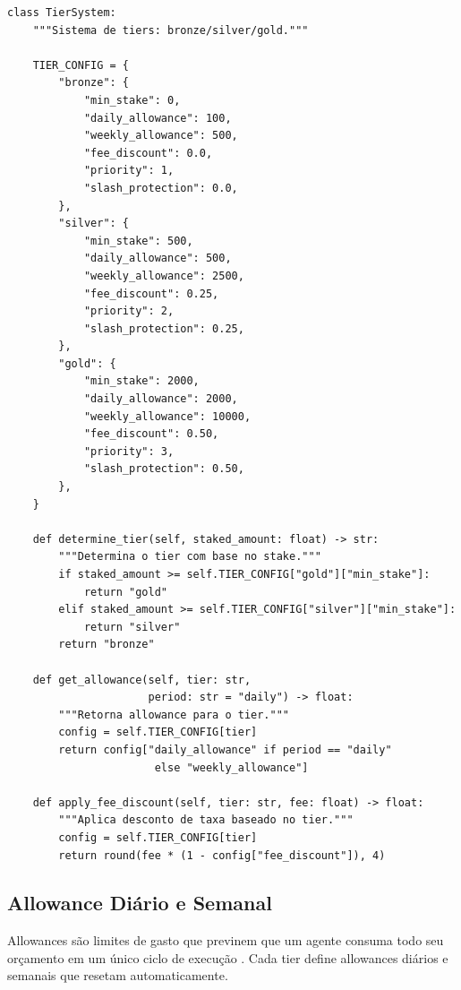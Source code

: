 \begin{lstlisting}[caption={Sistema de tiers da SPEC-023},label={lst:tiers}]
class TierSystem:
    """Sistema de tiers: bronze/silver/gold."""

    TIER_CONFIG = {
        "bronze": {
            "min_stake": 0,
            "daily_allowance": 100,
            "weekly_allowance": 500,
            "fee_discount": 0.0,
            "priority": 1,
            "slash_protection": 0.0,
        },
        "silver": {
            "min_stake": 500,
            "daily_allowance": 500,
            "weekly_allowance": 2500,
            "fee_discount": 0.25,
            "priority": 2,
            "slash_protection": 0.25,
        },
        "gold": {
            "min_stake": 2000,
            "daily_allowance": 2000,
            "weekly_allowance": 10000,
            "fee_discount": 0.50,
            "priority": 3,
            "slash_protection": 0.50,
        },
    }

    def determine_tier(self, staked_amount: float) -> str:
        """Determina o tier com base no stake."""
        if staked_amount >= self.TIER_CONFIG["gold"]["min_stake"]:
            return "gold"
        elif staked_amount >= self.TIER_CONFIG["silver"]["min_stake"]:
            return "silver"
        return "bronze"

    def get_allowance(self, tier: str,
                      period: str = "daily") -> float:
        """Retorna allowance para o tier."""
        config = self.TIER_CONFIG[tier]
        return config["daily_allowance" if period == "daily"
                       else "weekly_allowance"]

    def apply_fee_discount(self, tier: str, fee: float) -> float:
        """Aplica desconto de taxa baseado no tier."""
        config = self.TIER_CONFIG[tier]
        return round(fee * (1 - config["fee_discount"]), 4)
\end{lstlisting}

\subsection{Allowance Diário e Semanal}

Allowances são limites de gasto que previnem que um agente consuma
todo seu orçamento em um único ciclo de execução
\cite{opencode2026token}. Cada tier define allowances diários e
semanais que resetam automaticamente.


